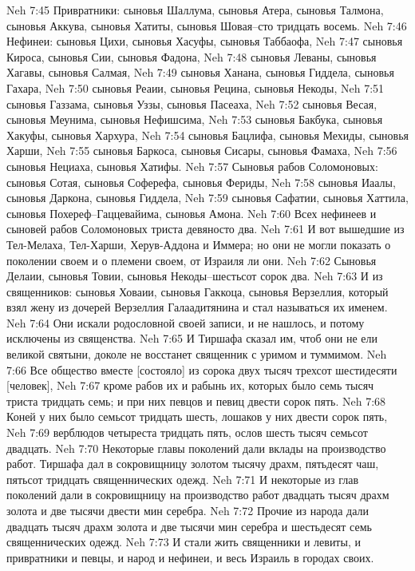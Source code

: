 Neh 7:45  Привратники: сыновья Шаллума, сыновья Атера, сыновья Талмона, сыновья Аккува, сыновья Хатиты, сыновья Шовая--сто тридцать восемь.
Neh 7:46  Нефинеи: сыновья Цихи, сыновья Хасуфы, сыновья Таббаофа,
Neh 7:47  сыновья Кироса, сыновья Сии, сыновья Фадона,
Neh 7:48  сыновья Леваны, сыновья Хагавы, сыновья Салмая,
Neh 7:49  сыновья Ханана, сыновья Гиддела, сыновья Гахара,
Neh 7:50  сыновья Реаии, сыновья Рецина, сыновья Некоды,
Neh 7:51  сыновья Газзама, сыновья Уззы, сыновья Пасеаха,
Neh 7:52  сыновья Весая, сыновья Меунима, сыновья Нефишсима,
Neh 7:53  сыновья Бакбука, сыновья Хакуфы, сыновья Хархура,
Neh 7:54  сыновья Бацлифа, сыновья Мехиды, сыновья Харши,
Neh 7:55  сыновья Баркоса, сыновья Сисары, сыновья Фамаха,
Neh 7:56  сыновья Нециаха, сыновья Хатифы.
Neh 7:57  Сыновья рабов Соломоновых: сыновья Сотая, сыновья Соферефа, сыновья Фериды,
Neh 7:58  сыновья Иаалы, сыновья Даркона, сыновья Гиддела,
Neh 7:59  сыновья Сафатии, сыновья Хаттила, сыновья Похереф--Гаццевайима, сыновья Амона.
Neh 7:60  Всех нефинеев и сыновей рабов Соломоновых триста девяносто два.
Neh 7:61  И вот вышедшие из Тел-Мелаха, Тел-Харши, Херув-Аддона и Иммера; но они не могли показать о поколении своем и о племени своем, от Израиля ли они.
Neh 7:62  Сыновья Делаии, сыновья Товии, сыновья Некоды--шестьсот сорок два.
Neh 7:63  И из священников: сыновья Ховаии, сыновья Гаккоца, сыновья Верзеллия, который взял жену из дочерей Верзеллия Галаадитянина и стал называться их именем.
Neh 7:64  Они искали родословной своей записи, и не нашлось, и потому исключены из священства.
Neh 7:65  И Тиршафа сказал им, чтоб они не ели великой святыни, доколе не восстанет священник с уримом и туммимом.
Neh 7:66  Все общество вместе [состояло] из сорока двух тысяч трехсот шестидесяти [человек],
Neh 7:67  кроме рабов их и рабынь их, которых было семь тысяч триста тридцать семь; и при них певцов и певиц двести сорок пять.
Neh 7:68  Коней у них было семьсот тридцать шесть, лошаков у них двести сорок пять,
Neh 7:69  верблюдов четыреста тридцать пять, ослов шесть тысяч семьсот двадцать.
Neh 7:70  Некоторые главы поколений дали вклады на производство работ. Тиршафа дал в сокровищницу золотом тысячу драхм, пятьдесят чаш, пятьсот тридцать священнических одежд.
Neh 7:71  И некоторые из глав поколений дали в сокровищницу на производство работ двадцать тысяч драхм золота и две тысячи двести мин серебра.
Neh 7:72  Прочие из народа дали двадцать тысяч драхм золота и две тысячи мин серебра и шестьдесят семь священнических одежд.
Neh 7:73  И стали жить священники и левиты, и привратники и певцы, и народ и нефинеи, и весь Израиль в городах своих.
